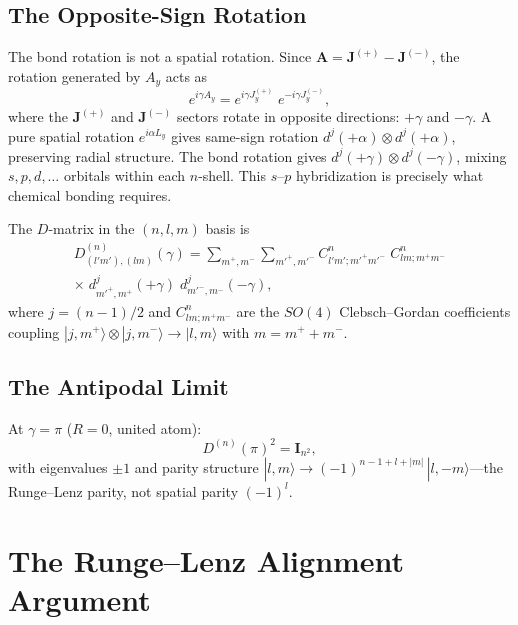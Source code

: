 \documentclass[aps,pra,twocolumn,superscriptaddress,longbibliography]{revtex4-2}
\begin{document}
\subsection{The Opposite-Sign Rotation}
\label{sec:opposite_sign}

The bond rotation is not a spatial rotation.  Since
$\mathbf{A} = \mathbf{J}^{(+)} - \mathbf{J}^{(-)}$, the rotation
generated by $A_y$ acts as
\begin{equation}
e^{i\gamma A_y}
= e^{i\gamma J^{(+)}_y}\; e^{-i\gamma J^{(-)}_y},
\label{eq:opposite_sign}
\end{equation}
where the $\mathbf{J}^{(+)}$ and $\mathbf{J}^{(-)}$ sectors rotate in
opposite directions: $+\gamma$ and $-\gamma$.  A pure spatial rotation
$e^{i\alpha L_y}$ gives same-sign rotation $d^j(+\alpha) \otimes
d^j(+\alpha)$, preserving radial structure.  The bond rotation gives
$d^j(+\gamma) \otimes d^j(-\gamma)$, mixing $s, p, d, \ldots$
orbitals within each $n$-shell.  This $s$--$p$ hybridization is
precisely what chemical bonding requires.

The $D$-matrix in the $(n, l, m)$ basis is
\begin{multline}
D^{(n)}_{(l'm'),(lm)}(\gamma)
= \sum_{m^+, m^-} \sum_{m'^+, m'^-}
C^{n}_{l'm'; m'^+m'^-}\; C^{n}_{lm; m^+m^-} \\
\times\; d^{j}_{m'^+, m^+}(+\gamma)\;
d^{j}_{m'^-, m^-}(-\gamma),
\label{eq:D_nlm}
\end{multline}
where $j = (n-1)/2$ and $C^{n}_{lm; m^+m^-}$ are the $SO(4)$
Clebsch--Gordan coefficients coupling
$|j, m^+\rangle \otimes |j, m^-\rangle \to |l, m\rangle$ with
$m = m^+ + m^-$.

\subsection{The Antipodal Limit}

At $\gamma = \pi$ ($R = 0$, united atom):
\begin{equation}
D^{(n)}(\pi)^2 = \mathbf{I}_{n^2},
\label{eq:D_pi_squared}
\end{equation}
with eigenvalues $\pm 1$ and parity structure
$|l, m\rangle \to (-1)^{n-1+l+|m|}\, |l, -m\rangle$---the
Runge--Lenz parity, not spatial parity $(-1)^l$.


\section{The Runge--Lenz Alignment Argument}
\label{sec:runge_lenz}
\end{document}
